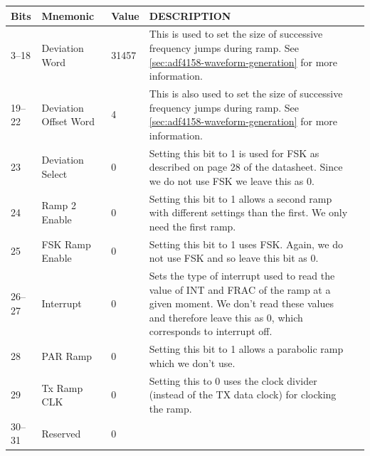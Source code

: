 \label{tab:adf4158-reg-map-5}
\begin{tabularx}{\textwidth}{l l l X>{\raggedright\arraybackslash}X}
  \caption{DEVIATION REGISTER (R5) MAP} \\
  \toprule
  \textbf{Bits} & \textbf{Mnemonic} & \textbf{Value} & \textbf{DESCRIPTION} \\
  \midrule

  \endhead{}

  3--18 & Deviation Word & 31457 & This is used to set the size of successive frequency jumps during
                                   ramp. See \cref{sec:adf4158-waveform-generation} for more
                                   information. \\
  19--22 & Deviation Offset Word & 4 & This is also used to set the size of successive frequency
                                       jumps during ramp. See \cref{sec:adf4158-waveform-generation}
                                       for more information. \\
  23 & Deviation Select & 0 & Setting this bit to 1 is used for FSK as described on page 28 of the
                              datasheet. Since we do not use FSK we leave this as 0. \\
  24 & Ramp 2 Enable & 0 & Setting this bit to 1 allows a second ramp with different settings than
                           the first. We only need the first ramp. \\
  25 & FSK Ramp Enable & 0 & Setting this bit to 1 uses FSK. Again, we do not use FSK and so leave
                             this bit as 0. \\
  26--27 & Interrupt & 0 & Sets the type of interrupt used to read the value of INT and FRAC of the
                           ramp at a given moment. We don't read these values and therefore leave
                           this as 0, which corresponds to interrupt off. \\
  28 & PAR Ramp & 0 & Setting this bit to 1 allows a parabolic ramp which we don't use. \\
  29 & Tx Ramp CLK & 0 & Setting this to 0 uses the clock divider (instead of the TX data clock) for
                         clocking the ramp. \\
  30--31 & Reserved & 0 & \\

  \bottomrule
\end{tabularx}


